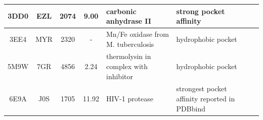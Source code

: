 \begin{table}[H]
\begin{tabular}{ccccp{1.5in}p{1.5in}c}
      3DD0 & EZL     & 2074  & 9.00  & carbonic anhydrase II                      & strong pocket affinity                                                     & \cite{benchmark_strong_2021}      \\ \hline
      3EE4 & MYR     & 2320  & -     & Mn/Fe oxidase from M. tuberculosis         & hydrophobic pocket                                                         & \cite{benchmark_hydrophobic_2009} \\ \hline
      5M9W & 7GR     & 4856  & 2.24  & thermolysin in complex with inhibitor      & hydrophobic pocket                                                         & \cite{hydrophobic_2017}           \\ \hline
      6E9A & J0S     & 1705  & 11.92 & HIV-1 protease                             & strongest pocket affinity reported in PDBbind                              & \cite{pdbbind_2004}               \\ \hline
    \end{tabular}
  \end{table}


